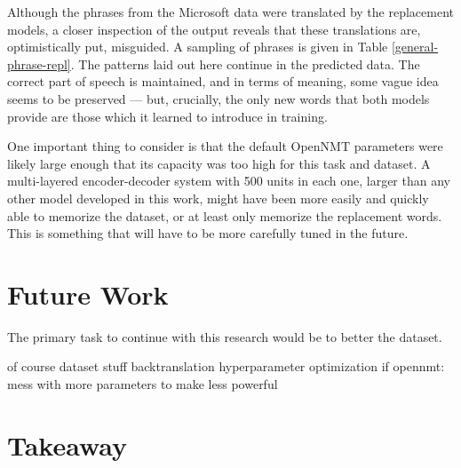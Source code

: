 Although the phrases from the Microsoft data were translated by the replacement models, a closer inspection of the output reveals that these translations are, optimistically put, misguided. A sampling of phrases is given in Table \ref{general-phrase-repl}. The patterns laid out here continue in the predicted data. The correct part of speech is maintained, and in terms of meaning, some vague idea seems to be preserved --- but, crucially, the only new words that both models provide are those which it learned to introduce in training.

One important thing to consider is that the default OpenNMT parameters were likely large enough that its capacity was too high for this task and dataset. A multi-layered encoder-decoder system with 500 units in each one, larger than any other model developed in this work, might have been more easily and quickly able to memorize the dataset, or at least only memorize the replacement words. This is something that will have to be more carefully tuned in the future.

\section{Future Work}

The primary task to continue with this research would be to better the dataset.

of course dataset stuff
backtranslation
hyperparameter optimization
if opennmt: mess with more parameters to make less powerful

\section{Takeaway}
